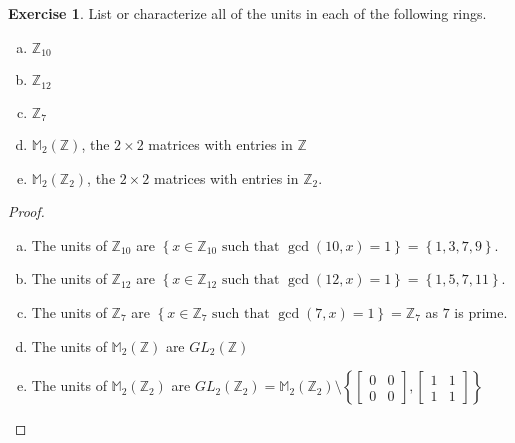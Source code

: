 \documentclass{article}
\theoremstyle{definition}
\newtheorem{theorem}{Exercise}[section]
\theoremstyle{plain}
\newcommand{\Z}{\mathbb{Z}}
\begin{document}
	
	\begin{theorem}
		List or characterize all of the units in each of the following rings.
		\begin{multicols}{2}
		\begin{enumerate}[(a)]
			\item $\Z_{10}$
			\item $\Z_{12}$
			\item $\Z_7$
			\item $\mathbb{M}_2 \left( \Z \right)$, the $2 \times 2$ matrices with entries in $\Z$
			\item $\mathbb{M}_2 \left( \Z_2 \right)$, the $2 \times 2$ matrices with entries in $\Z_2$. 
		\end{enumerate}
		\end{multicols}
	\end{theorem}
	\begin{proof}
		\begin{enumerate}[(a)]
			\item The units of $\Z_{10}$ are $\left\{ x \in \Z_{10} \text{ such that } \gcd(10,x) = 1\right\} = \left\{ 1, 3, 7, 9\right\}$.
			\item The units of $\Z_{12}$ are $\left\{ x \in \Z_{12} \text{ such that } \gcd(12,x) = 1\right\} = \left\{ 1, 5, 7, 11\right\}$.
			\item The units of $\Z_{7}$ are $\left\{ x \in \Z_{7} \text{ such that } \gcd(7,x) = 1\right\} = \Z_7$ as $7$ is prime.
			\item The units of $\mathbb{M}_2\left( \Z \right)$ are $GL_2\left( \Z \right)$
			\item The units of $\mathbb{M}_2\left( \Z_2 \right)$ are $GL_2\left( \Z_2 \right) = \mathbb{M}_2 \left( \Z_2 \right) \setminus \left\{ \left[ \begin{smallmatrix} 0 & 0\\ 0 & 0 \end{smallmatrix} \right], \left[ \begin{smallmatrix} 1 & 1\\ 1 & 1 \end{smallmatrix} \right] \right\}$ \qedhere 
		\end{enumerate}
	\end{proof}
	
\end{document}
